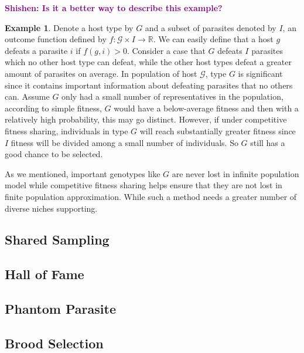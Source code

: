 \documentclass[a4paper,11pt]{report}
\theoremstyle{plain} %
\theoremstyle{definition} %
\newtheorem{eg}[thm]{Example}
\theoremstyle{remark} %
\newcommand{\shishen}[1]{\textbf{\textcolor{purple}{Shishen: #1}}}
\begin{document}
\shishen{Is it a better way to describe this example?}
\begin{eg} Denote a host type by $G$ and a subset of parasites denoted by $I$, an outcome function defined by $f:\mathcal{G}\times I \rightarrow \mathbb{R}$. We can easily define that a host $g$ defeats a parasite $i$ if $f(g,i)>0$. Consider a case that $G$ defeats $I$ parasites which no other host type can defeat, while the other host types defeat a greater amount of parasites on average. In population of host $\mathcal{G}$, type $G$ is significant since it contains important information about defeating parasites that no others can. Assume $G$ only had a small number of representatives in the population, according to simple fitness, $G$ would have a below-average fitness and then with a relatively high probability, this may go distinct. However, if under competitive fitness sharing, individuals in type $G$ will reach substantially greater fitness since $I$ fitness will be divided among a small number of individuals. So $G$ still has a good chance to be selected.
\end{eg}

\par As we mentioned, important genotypes like $G$ are never lost in infinite population model while competitive fitness sharing helps ensure that they are not lost in finite population approximation. While such a method needs a greater number of diverse niches supporting.

\subsection{Shared Sampling}


\subsection{Hall of Fame}

\subsection{Phantom Parasite}

\subsection{Brood Selection}

\newpage
\end{document}
